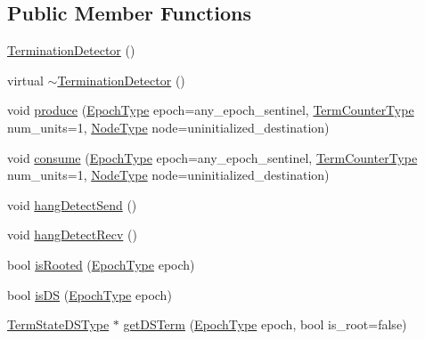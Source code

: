 \subsection*{Public Member Functions}
\begin{DoxyCompactItemize}
\item 
\hyperlink{structvt_1_1term_1_1_termination_detector_a9e6bc0a436aa1bb5f6b344ac795b3303}{Termination\+Detector} ()
\item 
virtual \hyperlink{structvt_1_1term_1_1_termination_detector_a1a1a29c2374a70427d8173ec31d55421}{$\sim$\+Termination\+Detector} ()
\item 
void \hyperlink{structvt_1_1term_1_1_termination_detector_a3c31a1c36b5d55e9d28b5b26b2436573}{produce} (\hyperlink{namespacevt_a985a5adf291c34a3ca263b3378388236}{Epoch\+Type} epoch=any\+\_\+epoch\+\_\+sentinel, \hyperlink{namespacevt_1_1term_a4fd378cdb0c36683afc1b3399d685f7f}{Term\+Counter\+Type} num\+\_\+units=1, \hyperlink{namespacevt_a866da9d0efc19c0a1ce79e9e492f47e2}{Node\+Type} node=uninitialized\+\_\+destination)
\item 
void \hyperlink{structvt_1_1term_1_1_termination_detector_a950215186c7303d99316ece6ea31c4cd}{consume} (\hyperlink{namespacevt_a985a5adf291c34a3ca263b3378388236}{Epoch\+Type} epoch=any\+\_\+epoch\+\_\+sentinel, \hyperlink{namespacevt_1_1term_a4fd378cdb0c36683afc1b3399d685f7f}{Term\+Counter\+Type} num\+\_\+units=1, \hyperlink{namespacevt_a866da9d0efc19c0a1ce79e9e492f47e2}{Node\+Type} node=uninitialized\+\_\+destination)
\item 
void \hyperlink{structvt_1_1term_1_1_termination_detector_ad863add6716d920778eef1298016a0ea}{hang\+Detect\+Send} ()
\item 
void \hyperlink{structvt_1_1term_1_1_termination_detector_ad9b79c662481216d0bb70f81b12dfbf8}{hang\+Detect\+Recv} ()
\item 
bool \hyperlink{structvt_1_1term_1_1_termination_detector_ad95b226357b77e29c415627bbca4e798}{is\+Rooted} (\hyperlink{namespacevt_a985a5adf291c34a3ca263b3378388236}{Epoch\+Type} epoch)
\item 
bool \hyperlink{structvt_1_1term_1_1_termination_detector_a3ab6ba4618093384b6ddd6c0607df543}{is\+DS} (\hyperlink{namespacevt_a985a5adf291c34a3ca263b3378388236}{Epoch\+Type} epoch)
\item 
\hyperlink{structvt_1_1term_1_1_termination_detector_aa96c37b5c120063060c6418c48e64bd1}{Term\+State\+D\+S\+Type} $\ast$ \hyperlink{structvt_1_1term_1_1_termination_detector_a546a48949da827a98dea2cfaffeddb91}{get\+D\+S\+Term} (\hyperlink{namespacevt_a985a5adf291c34a3ca263b3378388236}{Epoch\+Type} epoch, bool is\+\_\+root=false)

\end{DoxyCompactItemize}
